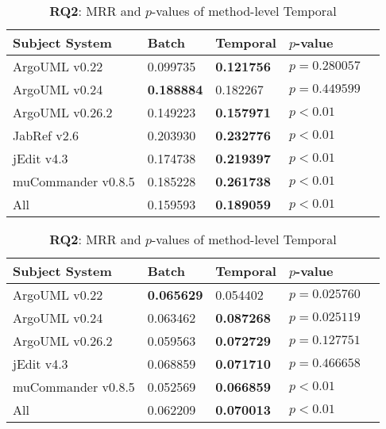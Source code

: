 \begin{table}[t]
\renewcommand{\arraystretch}{1.3}
\footnotesize
\centering
\caption{{\bf RQ2}: MRR and $p$-values of class-level Temporal}
\begin{tabular}{l|ll|ll}
\toprule
Subject System & Batch & Temporal & $p$-value  \\
\midrule
ArgoUML v0.22 & 0.099735 & {\bf 0.121756 } & $p = 0.280057$ \\
ArgoUML v0.24 & {\bf 0.188884 } & 0.182267 & $p = 0.449599$ \\
ArgoUML v0.26.2 & 0.149223 & {\bf 0.157971 } & $p < 0.01$ \\
JabRef v2.6 & 0.203930 & {\bf 0.232776 } & $p < 0.01$ \\
jEdit v4.3 & 0.174738 & {\bf 0.219397 } & $p < 0.01$ \\
muCommander v0.8.5 & 0.185228 & {\bf 0.261738 } & $p < 0.01$ \\
\midrule
All & 0.159593 & {\bf 0.189059 } & $p < 0.01$ \\
\bottomrule
\end{tabular}
\label{table:rq2:class:lda}
\caption{{\bf RQ2}: MRR and $p$-values of method-level Temporal}
\begin{tabular}{l|ll|ll}
\toprule
Subject System & Batch & Temporal & $p$-value  \\
\midrule
ArgoUML v0.22 & {\bf 0.065629 } & 0.054402 & $p = 0.025760$ \\
ArgoUML v0.24 & 0.063462 & {\bf 0.087268 } & $p = 0.025119$ \\
ArgoUML v0.26.2 & 0.059563 & {\bf 0.072729 } & $p = 0.127751$ \\
jEdit v4.3 & 0.068859 & {\bf 0.071710 } & $p = 0.466658$ \\
muCommander v0.8.5 & 0.052569 & {\bf 0.066859 } & $p < 0.01$ \\
\midrule
All & 0.062209 & {\bf 0.070013 } & $p < 0.01$ \\
\bottomrule
\end{tabular}
\label{table:rq2:method:lda}
\end{table}
